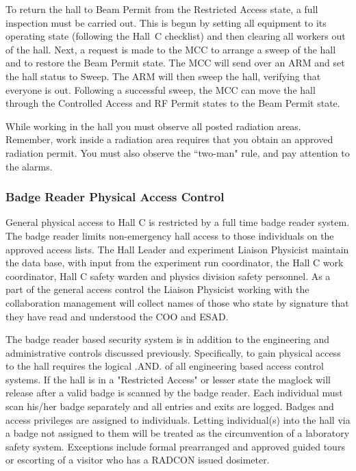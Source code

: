 To return the hall to Beam Permit from the Restricted Access state, a 
full inspection must
be carried out. This is begun by setting all equipment to its operating
state (following the Hall~C
checklist) and then clearing all workers out of the hall. Next, a request
is made to the MCC to
arrange a sweep of the hall and to restore the Beam Permit state. The MCC
will send over an
ARM and set the hall status to Sweep.  The ARM will then sweep the hall,
verifying that
everyone is out. Following a successful sweep, the MCC can move the hall
through the
Controlled Access and RF Permit states to the Beam Permit state.

While working in the hall you must observe all posted radiation areas.
Remember, work
inside a radiation area requires that you obtain an approved radiation
permit. You must also
observe the ``two-man" rule, and pay attention to the alarms.

\subsubsection{Badge Reader Physical Access Control}

General physical access to Hall C is restricted by a full time badge reader system. The badge
reader limits non-emergency hall access to those individuals on the approved access lists. The
Hall Leader and experiment Liaison Physicist maintain the data base, with input from the
experiment run coordinator, the Hall C work coordinator, Hall C safety warden and physics division
safety personnel. As a part of the general access control the Liaison Physicist working with the collaboration
management will collect names of those who state by signature that they have read and understood
the COO and ESAD.

The badge reader based security system is in addition to the engineering and administrative
controls discussed previously. Specifically, to gain physical access to the hall
requires the logical .AND. of all engineering based access control systems. If the hall is in a 
"Restricted Access" or lesser state the maglock will release after a valid badge is scanned by
the badge reader. Each individual must scan his/her badge separately and all
entries and exits are logged. Badges and access privileges are assigned to individuals. Letting
individual(s) into the hall via a badge not assigned to them will be treated as the circumvention
of a laboratory safety system. Exceptions include formal prearranged and approved guided tours or
escorting of a visitor who has a RADCON issued dosimeter. 

